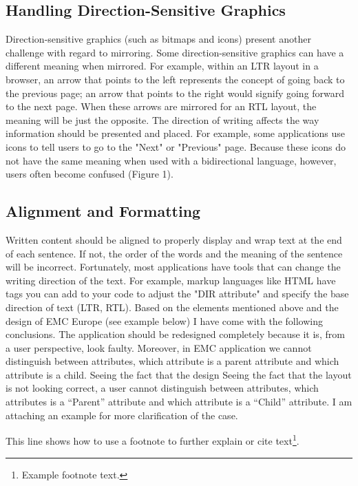 \documentclass[
	a4paper, %
	10pt, %
	unnumberedsections, %
	twoside, %
]{LTJournalArticle}
\begin{document}
\subsection{Handling Direction-Sensitive Graphics}

Direction-sensitive graphics (such as bitmaps and icons) present another challenge with regard to mirroring. Some direction-sensitive graphics can have a different meaning when mirrored. For example, within an LTR layout in a browser, an arrow that points to the left represents the concept of going back to the previous page; an arrow that points to the right would signify going forward to the next page. When these arrows are mirrored for an RTL layout, the meaning will be just the opposite. The direction of writing affects the way information should be presented and placed. For example, some applications use icons to tell users to go to the "Next" or "Previous" page. Because these icons do not have the same meaning when used with a bidirectional language, however, users often become confused (Figure 1). 


\subsection{Alignment and Formatting}

Written content should be aligned to properly display and wrap text at the end of each sentence. If not, the order of the words and the meaning of the sentence will be incorrect. Fortunately, most applications have tools that can change the writing direction of the text. For example, markup languages like HTML have tags you can add to your code to adjust the "DIR attribute" and specify the base direction of text (LTR, RTL). Based on the elements mentioned above and the design of EMC Europe (see example below) I have come with the following conclusions. The application should be redesigned completely because it is, from a user perspective, look faulty. Moreover, in EMC application we cannot distinguish between attributes, which attribute is a parent attribute and which attribute is a child. Seeing the fact that the design Seeing the fact that the layout is not looking correct, a user cannot distinguish between attributes, which attributes is a “Parent” attribute and which attribute is a “Child” attribute. I am attaching an example for more clarification of the case.

This line shows how to use a footnote to further explain or cite text\footnote{Example footnote text.}.
\end{document}
